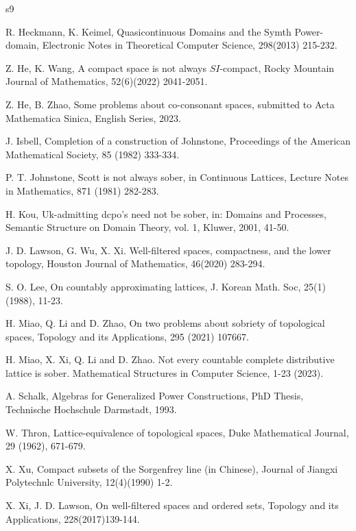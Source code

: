 \documentclass[preprint,12pt]{elsarticle}
\numberwithin{equation}{section}
\begin{document}
\begin{thebibliography}{s9}
{ R. Heckmann, K. Keimel, Quasicontinuous Domains and the Symth Power-domain, Electronic Notes in Theoretical Computer Science, 298(2013) 215-232.

 Z. He, K. Wang, A compact space is not always $SI$-compact, Rocky Mountain Journal of Mathematics, 52(6)(2022) 2041-2051.


 Z. He, B. Zhao, Some problems about co-consonant spaces, submitted to Acta Mathematica Sinica, English Series, 2023.

  J. Isbell, Completion of a construction of Johnstone, Proceedings of the American Mathematical Society,  85
(1982) 333-334.

 P. T. Johnstone, Scott is not always sober, in Continuous Lattices, Lecture Notes in Mathematics, 871 (1981) 282-283.


 H. Kou, Uk-admitting dcpo's need not be sober, in: Domains and Processes, Semantic Structure on Domain Theory, vol.
1, Kluwer, 2001, 41-50.


 J. D. Lawson, G. Wu, X. Xi. Well-filtered spaces, compactness, and the lower topology, Houston Journal of Mathematics, 46(2020)
    283-294.

  S. O. Lee, On countably approximating lattices, J. Korean Math. Soc, 25(1)(1988), 11-23.




 H. Miao, Q. Li and D. Zhao, On two problems about sobriety of topological spaces, Topology and its Applications, 295 (2021) 107667.

 H. Miao, X. Xi, Q. Li and D. Zhao. Not every countable complete distributive lattice is sober. Mathematical Structures in Computer Science, 1-23 (2023).

 A. Schalk, Algebras for Generalized Power Constructions, PhD Thesis, Technische Hochschule Darmstadt, 1993.

 W. Thron, Lattice-equivalence of topological spaces, Duke Mathematical Journal, 29 (1962), 671-679.



 X. Xu, Compact subsets of the Sorgenfrey line (in Chinese), Journal of Jiangxi Polytechnlc University, 12(4)(1990) 1-2.

 X. Xi, J. D. Lawson, On well-filtered spaces and ordered sets, Topology and its Applications, 228(2017)139-144.

}
\end{thebibliography}
\end{document}
